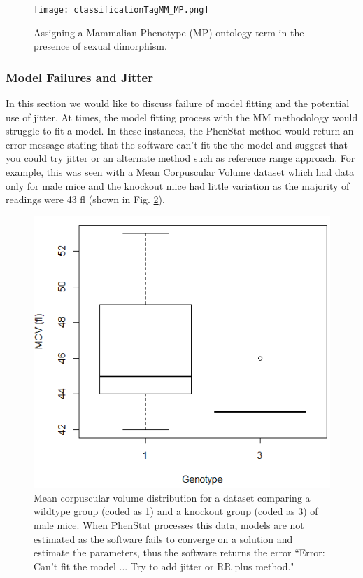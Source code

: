 \documentclass[12pt,a4paper]{article}
\begin{document}
\begin{figure}[!tpb]%
\centerline{\texttt{[image: classificationTagMM\_MP.png]}}
\caption{Assigning a Mammalian Phenotype (MP) ontology term in the presence of sexual dimorphism. }\label{fig:05_2}
\end{figure}


\subsubsection{Model Failures and Jitter}
In this section we would like to discuss failure of model fitting and the potential use of jitter.
At times,  the model fitting process with the MM methodology would struggle to fit a model.  In these instances,  the PhenStat method would return  an error message stating that the software can’t fit the the model  and suggest that you could try jitter or an alternate method such as reference range approach. For example,  this was seen with a Mean Corpuscular Volume dataset which had data only for male mice and the knockout mice had little variation as the majority of readings were 43 fl (shown in Fig. \ref{fig:05_x}).

\begin{figure}[!tpb]%
\centerline{\includegraphics[scale=0.6]{Jitter_figureX.png}}
\caption{Mean corpuscular volume distribution for a dataset comparing a wildtype group (coded as 1) and a knockout group (coded as 3) of male mice.
When PhenStat processes this data,  models are not estimated as the software fails to converge on a solution and estimate the parameters,  thus the software returns the error “Error: Can’t fit the model ... Try to add jitter or RR plus method."}\label{fig:05_x}
\end{figure}
\end{document}
